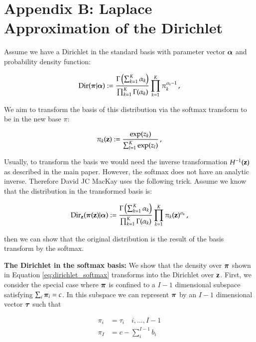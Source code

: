 \section*{Appendix B: Laplace Approximation of the Dirichlet}
\label{sec:LADirichlet}



Assume we have a Dirichlet in the standard basis with parameter vector ${\boldsymbol{\alpha}}$ and probability density function:

\begin{equation}\label{eq:dirichlet}
    \mathrm{Dir}(\boldsymbol{\pi} | {\boldsymbol{\alpha}}) := \frac{\Gamma \left( \sum_{k=1}^K \alpha_k \right)}{\prod_{k=1}^K \Gamma(\alpha_k)} \prod_{k=1}^K \pi_k^{\alpha_k-1} \, ,
\end{equation}

We aim to transform the basis of this distribution via the softmax transform to be in the new base $\pi$:

\begin{equation}\label{eq:softmax}
    \pi_k(\mathbf{z}) := \frac{\exp(z_k)}{\sum_{l=1}^K \exp(z_l)} \, ,
\end{equation}

Usually, to transform the basis we would need the inverse transformation $H^{-1}(\mathbf{z})$ as described in the main paper. However, the softmax does not have an analytic inverse. Therefore David JC MacKay uses the following trick. Assume we know that the distribution in the transformed basis is:

\begin{equation}\label{eq:dirichlet_softmax}
    \mathrm{Dir}_{\mathbf{z}}(\boldsymbol{\pi}(\mathbf{z}) | {\boldsymbol{\alpha}}) := \frac{\Gamma \left( \sum_{k=1}^K \alpha_k \right)}{\prod_{k=1}^K \Gamma(\alpha_k)} \prod_{k=1}^K \pi_k(\mathbf{z})^{\alpha_k} \, ,
\end{equation}

then we can show that the original distribution is the result of the basis transform by the softmax. 

\textbf{The Dirichlet in the softmax basis: } We show that the density over $\boldsymbol{\pi}$ shown in Equation \ref{eq:dirichlet_softmax} transforms into the Dirichlet over $\mathbf{z}$. First, we consider the special case where $\boldsymbol{\pi}$ is confined to a $I-1$ dimensional subspace satisfying $\sum_i \boldsymbol{\pi}_i = c$. In this subspace we can represent $\boldsymbol{\pi}$ by an $I - 1$ dimensional vector ${\boldsymbol{\tau}}$ such that 

\begin{align}
    \pi_i &= \tau_i \quad i,...,I-1 \\
    \pi_I &= c - \sum_i^{I-1} b_i
\end{align}

